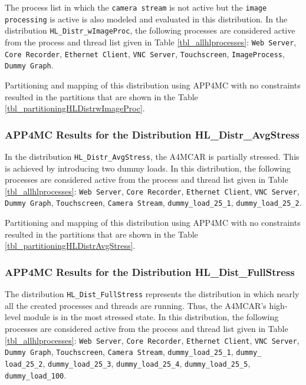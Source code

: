 The process list in which the \texttt{camera stream} is not active but the \texttt{image processing} is active is also modeled and evaluated in this distribution. In the distribution \texttt{HL{\_}Distr{\_}wImageProc}, the following processes are considered active from the process and thread list given in Table \ref{tbl_allhlprocesses}: \texttt{Web Server}, \texttt{Core Recorder}, \texttt{Ethernet Client}, \texttt{VNC Server}, \texttt{Touchscreen}, \texttt{ImageProcess}, \texttt{Dummy Graph}.

Partitioning and mapping of this distribution using APP4MC with no constraints resulted in the partitions that are shown in the Table \ref{tbl_partitioningHLDistrwImageProc}.

\partitioningHLDistrwImageProc


\subsubsection{APP4MC Results for the Distribution HL{\_}Distr{\_}AvgStress}

In the distribution \texttt{HL{\_}Distr{\_}AvgStress}, the A4MCAR is partially stressed. This is achieved by introducing two dummy loads. In this distribution, the following processes are considered active from the process and thread list given in Table \ref{tbl_allhlprocesses}: \texttt{Web Server}, \texttt{Core Recorder}, \texttt{Ethernet Client}, \texttt{VNC Server}, \texttt{Dummy Graph}, \texttt{Touchscreen}, \texttt{Camera Stream}, \texttt{dummy{\_}load{\_}25{\_}1}, \texttt{dummy{\_}load{\_}25{\_}2}.

Partitioning and mapping of this distribution using APP4MC with no constraints resulted in the partitions that are shown in the Table \ref{tbl_partitioningHLDistrAvgStress}.

\partitioningHLDistrAvgStress


\subsubsection{APP4MC Results for the Distribution HL{\_}Dist{\_}FullStress}

The distribution \texttt{HL{\_}Dist{\_}FullStress} represents the distribution in which nearly all the created processes and threads are running. Thus, the A4MCAR's high-level module is in the most stressed state. In this distribution, the following processes are considered active from the process and thread list given in Table \ref{tbl_allhlprocesses}: \texttt{Web Server}, \texttt{Core Recorder}, \texttt{Ethernet Client}, \texttt{VNC Server}, \texttt{Dummy Graph}, \texttt{Touchscreen}, \texttt{Camera Stream}, \texttt{dummy{\_}load{\_}25{\_}1}, \texttt{dummy{\_} load{\_}25{\_}2}, \texttt{dummy{\_}load{\_}25{\_}3}, \texttt{dummy{\_}load{\_}25{\_}4}, \texttt{dummy{\_}load{\_}25{\_}5}, \texttt{dummy{\_}load{\_}100}.

